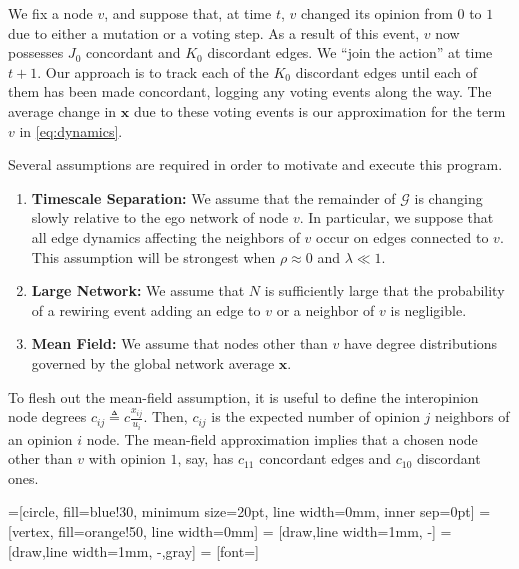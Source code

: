 \documentclass[english]{scrartcl}
\begin{document}
		We fix a node $v$, and suppose that, at time $t$, $v$ changed its opinion from $0$ to $1$ due to either a mutation or a voting step. 
		As a result of this event, $v$ now possesses $J_0$ concordant and $K_0$ discordant edges. 
		We ``join the action'' at time $t+1$. 
		Our approach is to track each of the $K_0$ discordant edges until each of them has been made concordant, logging any voting events along the way. 
		The average change in $\mathbf{x}$ due to these voting events is our approximation for the term $v$ in \eqref{eq:dynamics}. 

		Several assumptions are required in order to motivate and execute this program. 
		\begin{enumerate}
			\item \textbf{Timescale Separation:} We assume that the remainder of $\mathcal{G}$ is changing slowly relative to the ego network of node $v$. 
			In particular, we suppose that all edge dynamics affecting the neighbors of $v$ occur on edges connected to $v$. 
			This assumption will be strongest when $\rho \approx 0$ and $\lambda \ll 1$. 
			\item \textbf{Large Network:} We assume that $N$ is sufficiently large that the probability of a rewiring event adding an edge to $v$ or a neighbor of $v$ is negligible. 
			\item \textbf{Mean Field:} We assume that nodes other than $v$ have degree distributions governed by the global network average $\mathbf{x}$. 
		\end{enumerate}
		To flesh out the mean-field assumption, it is useful to define the interopinion node degrees $c_{ij} \triangleq c\frac{x_{ij}}{u_i}$. 
		Then, $c_{ij}$ is the expected number of opinion $j$ neighbors of an opinion $i$ node. 
		The mean-field approximation implies that a chosen node other than $v$ with opinion $1$, say, has $c_{11}$ concordant edges and $c_{10}$ discordant ones. 









		=[circle, fill=blue!30, minimum size=20pt, line width=0mm, inner sep=0pt]
		 = [vertex, fill=orange!50, line width=0mm]
		 = [draw,line width=1mm, -]
		 = [draw,line width=1mm, -,gray]
		 = [font=\small]
\end{document}
